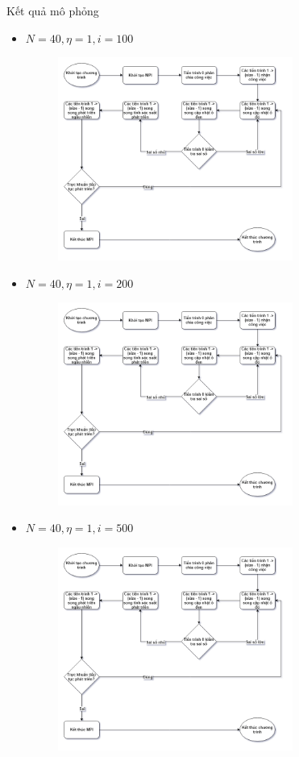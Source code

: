 \begin{frame}[allowframebreaks]{Kết quả mô phỏng}
\begin{itemize}
	\item $N = 40, \eta = 1, i = 100$
    \begin{figure}[H]
        \centering
        \includegraphics[width=77mm]{img/algo-flowchart.png}
    \end{figure}
\end{itemize}
\break
\begin{itemize}
    \item $N = 40, \eta = 1, i = 200$
    \begin{figure}[H]
        \centering
        \includegraphics[width=77mm]{img/algo-flowchart.png}
    \end{figure}
\end{itemize}
\break
\begin{itemize}
    \item $N = 40, \eta = 1, i = 500$
    \begin{figure}[H]
        \centering
        \includegraphics[width=77mm]{img/algo-flowchart.png}

\end{figure}
\end{itemize}
\end{frame}
